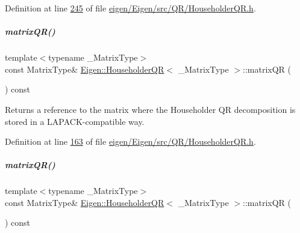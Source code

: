 Definition at line \hyperlink{eigen_2_eigen_2src_2_q_r_2_householder_q_r_8h_source_l00245}{245} of file \hyperlink{eigen_2_eigen_2src_2_q_r_2_householder_q_r_8h_source}{eigen/\+Eigen/src/\+Q\+R/\+Householder\+Q\+R.\+h}.

\mbox{\label{group___q_r___module_ae837f2fb30099212c53b3042c7d699c9}} 
\subparagraph{\texorpdfstring{matrix\+Q\+R()}{matrixQR()}\hspace{0.1cm}{\footnotesize\ttfamily [1/2]}}
{\footnotesize\ttfamily template$<$typename \+\_\+\+Matrix\+Type$>$ \\
const Matrix\+Type\& \hyperlink{group___q_r___module_class_eigen_1_1_householder_q_r}{Eigen\+::\+Householder\+QR}$<$ \+\_\+\+Matrix\+Type $>$\+::matrix\+QR (\begin{DoxyParamCaption}{ }\end{DoxyParamCaption}) const\hspace{0.3cm}{\ttfamily [inline]}}

\begin{DoxyReturn}{Returns}
a reference to the matrix where the Householder QR decomposition is stored in a L\+A\+P\+A\+C\+K-\/compatible way. 
\end{DoxyReturn}


Definition at line \hyperlink{eigen_2_eigen_2src_2_q_r_2_householder_q_r_8h_source_l00163}{163} of file \hyperlink{eigen_2_eigen_2src_2_q_r_2_householder_q_r_8h_source}{eigen/\+Eigen/src/\+Q\+R/\+Householder\+Q\+R.\+h}.

\mbox{\label{group___q_r___module_ae837f2fb30099212c53b3042c7d699c9}} 
\subparagraph{\texorpdfstring{matrix\+Q\+R()}{matrixQR()}\hspace{0.1cm}{\footnotesize\ttfamily [2/2]}}
{\footnotesize\ttfamily template$<$typename \+\_\+\+Matrix\+Type$>$ \\
const Matrix\+Type\& \hyperlink{group___q_r___module_class_eigen_1_1_householder_q_r}{Eigen\+::\+Householder\+QR}$<$ \+\_\+\+Matrix\+Type $>$\+::matrix\+QR (\begin{DoxyParamCaption}{ }\end{DoxyParamCaption}) const\hspace{0.3cm}{\ttfamily [inline]}}

